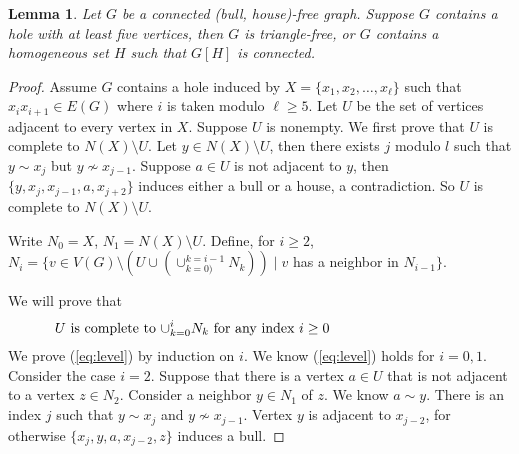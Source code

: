 \documentclass[a4paper,11pt]{article}
\newtheorem{lemma}[theorem]{Lemma}
\theoremstyle{case}
\begin{document}

\begin{lemma}\label{lem:hole}
    Let $G$ be a connected (bull, house)-free graph. Suppose $G$ contains a hole with at least five vertices, then $G$ is triangle-free, or $G$ contains a  homogeneous set $H$ such that $G[H]$ is connected.
\end{lemma}
\begin{proof}
    Assume $G$ contains a hole induced by $X = \{x_1, x_2, \ldots, x_{\ell}\}$ such that $x_{i}x_{i+1}\in E(G)$ where $i$ is taken modulo $ \ell \ge 5$. Let $U$ be the set of vertices
    adjacent to every vertex in $X$. Suppose $U$ is nonempty. We first prove that $U$ is complete to $N(X)\setminus U$. Let $y\in N(X)\setminus U$, then there exists $j$ modulo $l$ such that $y \sim x_j$  but  $y \not\sim x_{j-1}$. Suppose $a\in U$ is not adjacent to $y$, then $\{y, x_{j}, x_{j-1}, a, x_{j+2}\}$ induces either a bull or a house, a contradiction. So $U$ is complete to $N(X)\setminus U$.
    
    Write $N_0 = X$, $N_1 = N(X)\setminus U$. Define, for $i \geq 2$,  $N_i = \{ v \in V(G) \setminus (U \cup (\cup_{k=0)}^{k=i-1} N_k)) \; | \; v$ has a neighbor in $N_{i-1} \}$.

    We will prove that  
\begin{equation}\label{eq:level}
	\text{\parbox{.85\textwidth}{$U$ is complete to $\cup_{k=0}^{i} N_k$ for any index $i \geq 0$}}
\end{equation}
    We prove (\ref{eq:level}) by induction on $i$. We know (\ref{eq:level}) holds for $i = 0,1$. Consider the case $i=2$. Suppose that there is a vertex $a \in U$ that is not adjacent to a vertex $z \in N_2$. Consider a neighbor $y \in N_1$ of $z$. We know $a \sim y$. There is an index $j$ such that  $ y \sim x_j$ and  $ y \not\sim x_{j-1}$. Vertex $y$ is adjacent to $x_{j-2}$, for otherwise $\{ x_j, y, a, x_{j-2}, z \}$ induces a bull. 



\end{proof}
\end{document}
